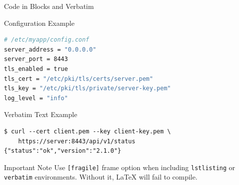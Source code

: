 \begin{frame}[fragile]{Code in Blocks and Verbatim}
  \begin{exampleblock}{\scriptsize Configuration Example}
    \begin{lstlisting}[language=bash, numbers=none, basicstyle=\ttfamily\fontsize{5}{6}\selectfont]
# /etc/myapp/config.conf
server_address = "0.0.0.0"
server_port = 8443
tls_enabled = true
tls_cert = "/etc/pki/tls/certs/server.pem"
tls_key = "/etc/pki/tls/private/server-key.pem"
log_level = "info"
    \end{lstlisting}
  \end{exampleblock}

  \vspace{0.05cm}

  \begin{block}{\scriptsize Verbatim Text Example}
    {\fontsize{5}{6}\selectfont
    \begin{verbatim}
$ curl --cert client.pem --key client-key.pem \
    https://server:8443/api/v1/status
{"status":"ok","version":"2.1.0"}
    \end{verbatim}}
  \end{block}

  \vspace{0.05cm}

  \begin{alertblock}{\scriptsize Important Note}
    \tiny
    Use \texttt{[fragile]} frame option when including \texttt{lstlisting} or
    \texttt{verbatim} environments. Without it, LaTeX will fail to compile.
  \end{alertblock}
\end{frame}

